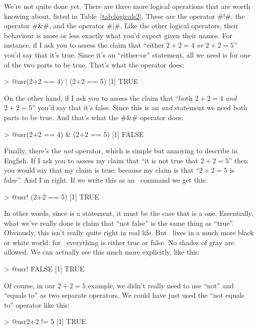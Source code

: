 We're not quite done yet. There are three more logical operations that are worth knowing about, listed in Table~\ref{tab:logicals2}. These are the  operator \rtextverb#!#, the  operator \rtextverb#&#, and the  operator \rtextverb#|#. Like the other logical operators, their behaviour is more or less exactly what you'd expect given their names. For instance, if I ask you to assess the claim that ``either $2+2 = 4$ {\it or} $2+2 = 5$'' you'd say that it's true. Since it's an ``either-or'' statement, all we need is for one of the two parts to be true. That's what the \rtext{|} operator does:
\begin{rblock1}
> @usr{(2+2 == 4) | (2+2 == 5)}
[1] TRUE
\end{rblock1}
On the other hand, if I ask you to assess the claim that ``both $2+2 = 4$ {\it and} $2+2 = 5$'' you'd say that it's false. Since this is an {\it and} statement we need both parts to be true. And that's what the \rtextverb#&# operator does:
\begin{rblock1}
> @usr{(2+2 == 4) & (2+2 == 5)}
[1] FALSE
\end{rblock1}
Finally, there's the {\it not} operator, which is simple but annoying to describe in English. If I ask you to assess my claim that ``it is not true that $2+2 = 5$'' then you would say that my claim is true; because my claim is that ``$2+2 = 5$ is false''. And I'm right. If we write this as an \R\ command we get this:  
\begin{rblock1}
> @usr{! (2+2 == 5)}
[1] TRUE
\end{rblock1}
In other words, since  is a  statement, it must be the case that  is a  one. Essentially, what we've really done is claim that ``not false'' is the same thing as ``true''. Obviously, this isn't really quite right in real life. But \R\ lives in a much more black or white world: for \R\ everything is either true or false. No shades of gray are allowed. We can actually see this much more explicitly, like this:
\begin{rblock1}
> @usr{! FALSE}
[1] TRUE
\end{rblock1}
Of course, in our $2+2 = 5$ example, we didn't really need to use ``not'' \rtext{!} and ``equals to'' \rtext{==} as two separate operators. We could have just used the ``not equals to'' operator \rtext{!=} like this:
\begin{rblock1}
> @usr{2+2 != 5}
[1] TRUE
\end{rblock1}
